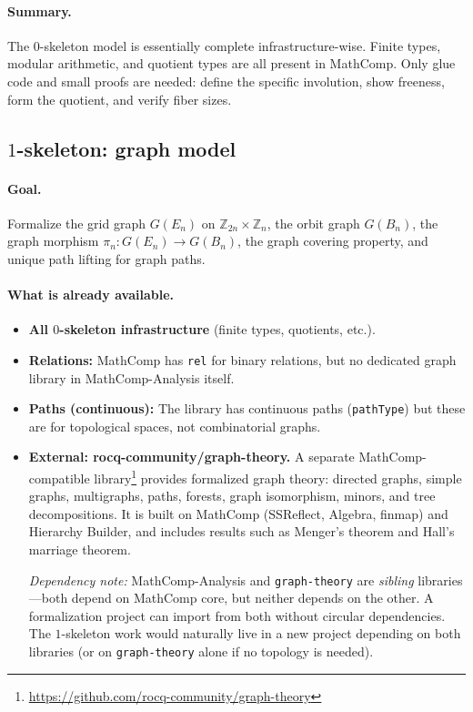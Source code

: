 \documentclass[11pt,a4paper]{article}
\theoremstyle{definition}
\theoremstyle{remark}
\begin{document}
\paragraph{Summary.}
The \(0\)-skeleton model is essentially complete infrastructure-wise. Finite types, modular arithmetic, and quotient types are all present in MathComp. Only glue code and small proofs are needed: define the specific involution, show freeness, form the quotient, and verify fiber sizes.

\subsection{\(1\)-skeleton: graph model}
\label{app:1-skeleton}

\paragraph{Goal.}
Formalize the grid graph \(G(E_n)\) on \(\mathbb{Z}_{2n}\times\mathbb{Z}_n\), the orbit graph \(G(B_n)\), the graph morphism \(\pi_n:G(E_n)\to G(B_n)\), the graph covering property, and unique path lifting for graph paths.

\paragraph{What is already available.}
\begin{itemize}
  \item \textbf{All \(0\)-skeleton infrastructure} (finite types, quotients, etc.).
  \item \textbf{Relations:} MathComp has \texttt{rel} for binary relations, but no dedicated graph library in MathComp-Analysis itself.
  \item \textbf{Paths (continuous):} The library has continuous paths (\texttt{pathType}) but these are for topological spaces, not combinatorial graphs.
  \item \textbf{External: rocq-community/graph-theory.} A separate MathComp-compatible library\footnote{\url{https://github.com/rocq-community/graph-theory}} provides formalized graph theory: directed graphs, simple graphs, multigraphs, paths, forests, graph isomorphism, minors, and tree decompositions. It is built on MathComp (SSReflect, Algebra, finmap) and Hierarchy Builder, and includes results such as Menger's theorem and Hall's marriage theorem.

  \emph{Dependency note:} MathComp-Analysis and \texttt{graph-theory} are \emph{sibling} libraries---both depend on MathComp core, but neither depends on the other. A formalization project can import from both without circular dependencies. The \(1\)-skeleton work would naturally live in a new project depending on both libraries (or on \texttt{graph-theory} alone if no topology is needed).
\end{itemize}
\end{document}

